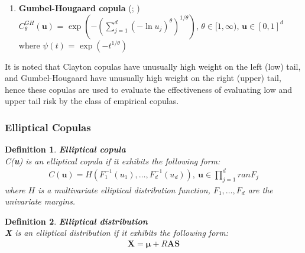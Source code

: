 \documentclass[12pt]{report}
\newtheorem{definition}{Definition}[subsection]
\newcommand{\1}{\mathbf{1}}
\begin{document}
\begin{flushleft}
\begin{enumerate}
\newpage
\item \textbf{Gumbel-Hougaard copula} (\cite{GumbelCopula}; \cite{HougaardCopula}) \\ 

\vspace{0.5cm}
$C^{GH}_{\theta}(\textbf{u})$ = $\exp \left( -( \sum\limits_{j = 1}^{d} (- \ln u_{j})^{\theta})^{1/\theta} \right)$, $\theta \in [1,\infty) $, $\textbf{u} \in [0,1]^{d}$ 
\\
\vspace{0.5cm}
where $\psi(t)$ = $\exp(-t^{1/\theta})$
\end{enumerate}

It is noted that Clayton copulas have unusually high weight on the left (low) tail, and Gumbel-Hougaard have unusually high weight on the right (upper) tail, hence these copulas are used to evaluate the effectiveness of evaluating low and upper tail risk by the class of empirical copulas. \\

\subsubsection{Elliptical Copulas}
\vspace{0.5cm}

\begin{definition}\label{EllipticalDefinition}
\textit{\normalfont\parencite{HofertBook}} \:\textbf{Elliptical copula} \\

C(\textbf{u}) is an elliptical copula if it exhibits the following form: \\
\vspace{-0.8cm}
\begin{align*}
C(\textbf{u}) = H(F^{-1}_{1}(u_{1}), \dots, F^{-1}_{d}(u_{d})), \: \textbf{u} \in \prod\limits_{j=1}^{d} ran F_{j}
\end{align*}
where $H$ is a multivariate elliptical distribution function, $F_{1}, \dots, F_{d}$ are the univariate margins.
\end{definition}

\begin{definition}\label{EllipticalDistribution}
\textit{\normalfont\parencite{HofertBook}}
\:\textbf{Elliptical distribution} \\

\textbf{X} is an elliptical distribution if it exhibits the following form: \\
\vspace{-0.8cm}
\begin{align*}
\textbf{X} = \boldsymbol{\mu} + R\textbf{A}\textbf{S}
\end{align*}


\end{definition}
\end{flushleft}
\end{document}
